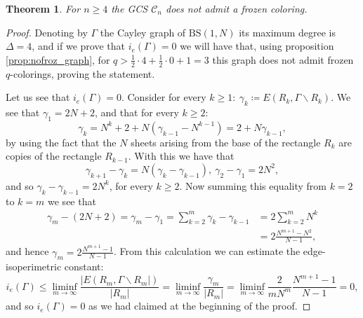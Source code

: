 \documentclass[letterpaper,10pt]{article}
\theoremstyle{plain}
\newtheorem{theorem}{Theorem}[section]
\newcommand{\BS}[1][N]{\mathrm{BS}(1,#1)}
\begin{document}
\begin{theorem} For $n\ge 4$ the GCS $\mathcal{C}_n$ does not admit a frozen coloring.
\end{theorem}
\begin{proof}
	Denoting by $\Gamma$ the Cayley graph of $\BS$ its maximum degree is $\Delta=4$, and if we prove that $i_e(\Gamma)=0$ we will have that, using proposition \ref{prop:nofroz_graph}, for $q>\frac{1}{2}\cdot 4+\frac{1}{2}\cdot 0+1=3$ this graph does not admit frozen $q$-colorings, proving the statement.
	
	Let us see that $i_e(\Gamma)=0$. Consider for every $k\ge 1: \ \gamma_{k}\coloneqq E(R_k,\Gamma\backslash R_k)$. We see that $\gamma_1=2N+2$, and that for every $k\ge 2$:
	$$
	\gamma_k=N^k+2+N(\gamma_{k-1}-N^{k-1})=2+N\gamma_{k-1},
	$$
	by using the fact that the $N$ sheets arising from the base of the rectangle $R_k$ are copies of the rectangle $R_{k-1}$. 
	With this we have that 
	$$
	\gamma_{k+1}-\gamma_{k}=N(\gamma_k-\gamma_{k-1}), \ \gamma_{2}-\gamma_{1}=2N^2,
	$$
	and so $\gamma_{k}-\gamma_{k-1}=2N^k$, for every $k\ge 2$. Now summing this equality from $k=2$ to $k=m$ we see that
	\begin{align*}
	\gamma_{m}-(2N+2)=\gamma_{m}-\gamma_{1}=\sum_{k=2}^m \gamma_{k}-\gamma_{k-1}&=2\sum_{k=2}^m N^k \\
	&= 2\frac{N^{m+1}-N^2}{N-1},
	\end{align*}
	and hence $\gamma_{m}=2\frac{N^{m+1}-1}{N-1}$. From this calculation we can estimate the edge-isoperimetric constant:
	$$
	i_e(\Gamma)\le \liminf_{m\to \infty}\frac{|E(R_m,\Gamma\backslash R_m|)}{|R_m|}=\liminf_{m\to \infty}\frac{\gamma_m}{|R_m|}=\liminf_{m\to \infty}\frac{2}{mN^m}\frac{N^{m+1}-1}{N-1}=0,
	$$
	and so $i_e(\Gamma)=0$ as we had claimed at the beginning of the proof.
\end{proof}
	
\end{document}
